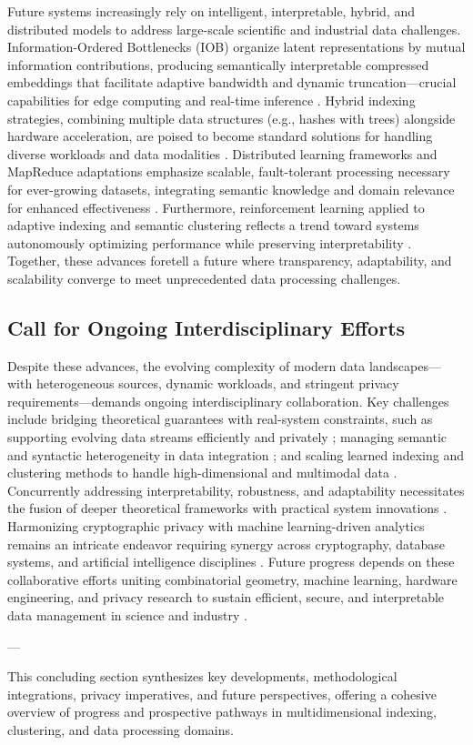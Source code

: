 \documentclass[sigconf]{acmart}
\begin{document}
Future systems increasingly rely on intelligent, interpretable, hybrid, and distributed models to address large-scale scientific and industrial data challenges. Information-Ordered Bottlenecks (IOB) organize latent representations by mutual information contributions, producing semantically interpretable compressed embeddings that facilitate adaptive bandwidth and dynamic truncation—crucial capabilities for edge computing and real-time inference \cite{ref22}. Hybrid indexing strategies, combining multiple data structures (e.g., hashes with trees) alongside hardware acceleration, are poised to become standard solutions for handling diverse workloads and data modalities \cite{ref35,ref27}. Distributed learning frameworks and MapReduce adaptations emphasize scalable, fault-tolerant processing necessary for ever-growing datasets, integrating semantic knowledge and domain relevance for enhanced effectiveness \cite{ref18,ref17}. Furthermore, reinforcement learning applied to adaptive indexing and semantic clustering reflects a trend toward systems autonomously optimizing performance while preserving interpretability \cite{ref33,ref16}. Together, these advances foretell a future where transparency, adaptability, and scalability converge to meet unprecedented data processing challenges.

\subsection{Call for Ongoing Interdisciplinary Efforts}

Despite these advances, the evolving complexity of modern data landscapes---with heterogeneous sources, dynamic workloads, and stringent privacy requirements---demands ongoing interdisciplinary collaboration. Key challenges include bridging theoretical guarantees with real-system constraints, such as supporting evolving data streams efficiently and privately \cite{ref8,ref31}; managing semantic and syntactic heterogeneity in data integration \cite{ref17}; and scaling learned indexing and clustering methods to handle high-dimensional and multimodal data \cite{ref30,ref16}. Concurrently addressing interpretability, robustness, and adaptability necessitates the fusion of deeper theoretical frameworks with practical system innovations \cite{ref22,ref33}. Harmonizing cryptographic privacy with machine learning-driven analytics remains an intricate endeavor requiring synergy across cryptography, database systems, and artificial intelligence disciplines \cite{ref23,ref28}. Future progress depends on these collaborative efforts uniting combinatorial geometry, machine learning, hardware engineering, and privacy research to sustain efficient, secure, and interpretable data management in science and industry \cite{ref1,ref2,ref35}.

---

This concluding section synthesizes key developments, methodological integrations, privacy imperatives, and future perspectives, offering a cohesive overview of progress and prospective pathways in multidimensional indexing, clustering, and data processing domains.



\end{document}
